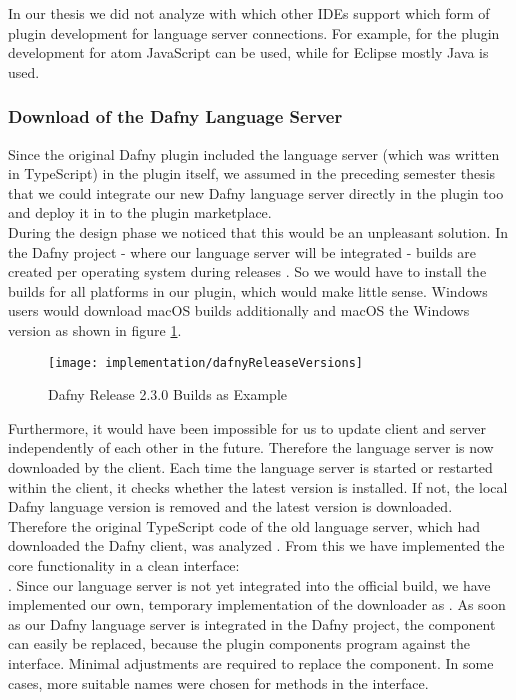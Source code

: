 In our thesis we did not analyze with which other IDEs support which form of plugin development for language server connections.
For example, for the plugin development for atom JavaScript \cite{plugin-atom} can be used,
while for Eclipse mostly Java \cite{plugin-eclipse} is used.

\subsubsection{Download of the Dafny Language Server}
\label{section:implementation:client:download}
Since the original Dafny plugin included the language server (which was written in TypeScript) in the plugin itself,
we assumed in the preceding semester thesis that we could integrate our new Dafny language server directly in the plugin too
and deploy it in to the plugin marketplace. \\

During the design phase we noticed that this would be an unpleasant solution.
In the Dafny project - where our language server will be integrated - builds
are created per operating system during releases \cite{dafny_lang_builds}.
So we would have to install the builds for all platforms in our plugin,
which would make little sense.
Windows users would download macOS builds additionally and macOS the Windows version as shown in figure \ref{fig:dafnyReleaseVersions}.

\begin{figure}[H]
    \centering
    \texttt{[image: implementation/dafnyReleaseVersions]}
    \caption{Dafny Release 2.3.0 Builds as Example}
    \label{fig:dafnyReleaseVersions}
\end{figure}

Furthermore, it would have been impossible for us to update client and server independently of each other in the future.
Therefore the language server is now downloaded by the client.
Each time the language server is started or restarted within the client,
it checks whether the latest version is installed.
If not, the local Dafny language version is removed and the latest version is downloaded. \\

Therefore the original TypeScript code of the old language server,
which had downloaded the Dafny client, was analyzed \cite{ts_dafny_installer}.
From this we have implemented the core functionality in a clean interface: \\
.
Since our language server is not yet integrated into the official build,
we have implemented our own, temporary implementation of the downloader as .
As soon as our Dafny language server is integrated in the Dafny project,
the component can easily be replaced, because the plugin components program against the interface.
Minimal adjustments are required to replace the component. In some cases, more suitable names were chosen for methods in the interface.

